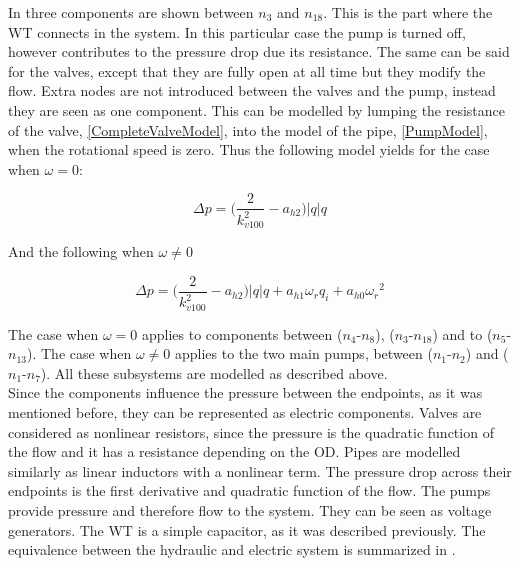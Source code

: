 In  three components are shown between $n_3$ and $n_{18}$. This is the part where the WT connects in the system. In this particular case the pump is turned off, however contributes to the pressure drop due its resistance. The same can be said for the valves, except that they are fully open at all time but they modify the flow. Extra nodes are not introduced between the valves and the pump, instead they are seen as one component. This can be modelled by lumping the resistance of the valve, \eqref{CompleteValveModel}, into the model of the pipe, \eqref{PumpModel}, when the rotational speed is zero. Thus the following model yields for the case when $\omega = 0$:

\begin{equation}
  \Delta p = \Big(\frac{2}{k_{v100}^2} - a_{h2}\Big)|q| q 
  \label{omega_zero}
\end{equation}

And the following when $\omega \neq 0$

\begin{equation}
  \Delta p = \Big(\frac{2}{k_{v100}^2} - a_{h2}\Big)|q| q  + a_{h1} \omega_r q_i + a_{h0}{\omega_r}^2
  \label{omega_notzero}
\end{equation}

The case when $\omega = 0$ applies to components between ($n_4$-$n_8$), ($n_3$-$n_{18}$)  and to ($n_5$-$n_{13}$). The case when $\omega \neq 0$ applies to the two main pumps, between ($n_1$-$n_2$) and ($n_1$-$n_7$). All these subsystems are modelled as described above. 
\\
Since the components influence the pressure between the endpoints, as it was mentioned before, they can be represented as electric components. Valves are considered as nonlinear resistors, since the pressure is the quadratic function of the flow and it has a resistance depending on the OD. Pipes are modelled similarly as linear inductors with a nonlinear term. The pressure drop across their endpoints is the first derivative and quadratic function of the flow. The pumps provide pressure and therefore flow to the system. They can be seen as voltage generators. The WT is a simple capacitor, as it was described previously. The equivalence between the hydraulic and electric system is summarized in .

